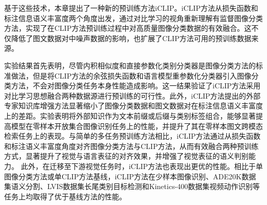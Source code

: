 基于这些技术，本章提出了一种新的预训练方法iCLIP。iCLIP方法从损失函数和标注信息语义丰富度两个角度出发，通过对比学习的视角重新理解有监督图像分类方法，实现了在CLIP方法预训练过程中对高质量图像分类数据的有效融合。这不仅降低了图文数据对中噪声数据的影响，也扩展了CLIP方法可用的预训练数据来源。

实验结果首先表明，尽管内积相似度和直接参数化类别分类器是图像分类方法的标准做法，但是将CLIP方法的余弦损失函数和语言模型重参数化分类器引入图像分类方法，不会对图像分类任务本身性能造成影响。这一结果验证了iCLIP方法采用对比学习思想融合两种数据源进行预训练的可行性。此外，iCLIP方法提出的外部专家知识库增强方法显著缩小了图像分类数据和图文数据对在标注信息语义丰富度上的差距。实验表明将外部知识作为文本前缀或后缀与类别标签组合，能够显著提高模型在零样本开放集合图像识别任务上的性能，并提升了其在零样本图文跨模态检索任务上的表现。与简单的多任务预训练方法相比，iCLIP方法通过从损失函数和标注语义丰富度角度对齐图像分类方法与CLIP方法，从而有效融合两种预训练方式，显著提升了视觉与语言表征的对齐效果，并增强了视觉表征的语义判别能力。
此外，在迁移至下游视觉任务时，iCLIP方法也表现出更优的性能。相比于单图像分类方法或单CLIP方法基线，iCLIP方法在少样本图像识别\cite{imagnettransfer}、ADE20K数据集语义分割\cite{zhou2019ade}、LVIS数据集长尾类别目标检测\cite{gupta2019lvis}和Kinetics-400数据集视频动作识别\cite{kay2017kinetics}等任务上均取得了优于基线方法的性能。


